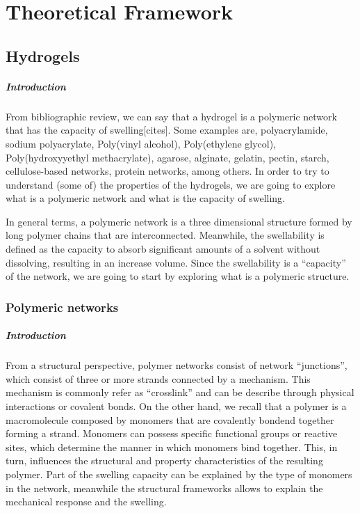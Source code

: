 \chapter{Theoretical Framework}\label{ch2:TheoFrame}

\section{Hydrogels}

\paragraph{Introduction} From bibliographic review, we can say that a hydrogel is a polymeric network that has the capacity of swelling[cites].
Some examples are,
    polyacrylamide,
    sodium polyacrylate,
    Poly(vinyl alcohol),
    Poly(ethylene glycol),
    Poly(hydroxyyethyl methacrylate),
    agarose,
    alginate,
    gelatin,
    pectin,
    starch,
    cellulose-based networks,
    protein networks,
    among others.
In order to try to understand (some of) the properties of the hydrogels, we are going to explore what is a polymeric network and what is the capacity of swelling.

In general terms, a polymeric network is a three dimensional structure formed by long polymer chains that are interconnected.
Meanwhile, the swellability is defined as the capacity to absorb significant amounts of a solvent without dissolving, resulting in an increase volume.
Since the swellability is a ``capacity'' of the network, we are going to start by exploring what is a polymeric structure\citep{bustamante-torresHydrogelsClassificationAccording2021}.

\subsection{Polymeric networks}

\paragraph{Introduction} From a structural perspective, polymer networks consist of network ``junctions'', which consist of three or more strands connected by a mechanism. 
This mechanism is commonly refer as ``crosslink'' and can be describe through physical interactions or covalent bonds.
On the other hand, we recall that a polymer is a macromolecule composed by monomers that are covalently bondend together forming a strand.
Monomers can possess specific functional groups or reactive sites, which determine the manner in which monomers bind together. 
This, in turn, influences the structural and property characteristics of the resulting polymer.
Part of the swelling capacity can be explained by the type of monomers in the network, meanwhile the structural frameworks allows to explain the mechanical response and the swelling.

